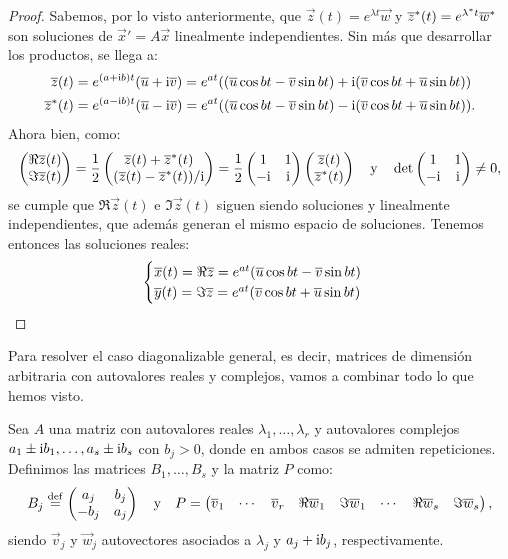 \documentclass[../ecuaciones_diferenciales.tex]{subfiles}
\begin{document}
\begin{proof}
	Sabemos, por lo visto anteriormente, que 
	\(\vec{z}(t) = e^{\lambda t} \vec{w}\) y
	\({\overline{z}}^\ast(t) = e^{{\lambda}^\ast t} {\overline{w}}^\ast\)
	son soluciones de \(\vec{x}' = A\vec{x}\) 
	linealmente independientes. Sin más que desarrollar los productos, se
	llega a:
	\begin{align*}
		\overline{z}(t) &= e^{(a + \mathrm{i} b)t} (\overline{u} + \mathrm{i}\overline{v}) 
		= e^{at} ((\overline{u}\cos bt - \overline{v}\sin bt) 
		+ \mathrm{i}(\overline{v}\cos bt +\overline{u}\sin bt)) \\
		{\overline{z}}^\ast(t) &= e^{(a - \mathrm{i} b)t} (\overline{u} - \mathrm{i}\overline{v}) 
		= e^{at} ((\overline{u}\cos bt - \overline{v}\sin bt) 
		- \mathrm{i}(\overline{v}\cos bt + \overline{u}\sin bt)).
	\end{align*}
	Ahora bien, como:
	\[\begin{pmatrix}\Re \overline{z}(t) \\ \Im \overline{z}(t)\end{pmatrix} 
		= \frac{1}{2} \begin{pmatrix}\overline{z}(t) + {\overline{z}}^\ast(t) \\
			(\overline{z}(t) - {\overline{z}}^\ast(t))/\mathrm{i}\end{pmatrix} 
		= \frac{1}{2}\begin{pmatrix}1 & 1 \\ -\mathrm{i} & \mathrm{i}\end{pmatrix} 
		\begin{pmatrix}\overline{z}(t) \\ {\overline{z}}^\ast(t)\end{pmatrix} 
		\quad \text{y} \quad 
		\det\begin{pmatrix}1 & 1 \\ -\mathrm{i} & \mathrm{i}\end{pmatrix} \neq 0,\]
	se cumple que \(\Re \vec{z}(t)\) e \(\Im \vec{z}(t)\) siguen siendo 
	soluciones y linealmente independientes, que además generan el mismo 
	espacio de soluciones. Tenemos entonces las soluciones reales:
	\[\begin{cases}
		\overline{x}(t) = \Re\overline{z} = e^{at}(\overline{u}\cos bt - \overline{v}\sin bt) \\
		\overline{y}(t) = \Im\overline{z} = e^{at}(\overline{v}\cos bt + \overline{u}\sin bt)\end{cases}\]
\end{proof}

Para resolver el caso diagonalizable general, es decir, matrices de dimensión
arbitraria con autovalores reales y complejos, vamos a combinar todo lo que 
hemos visto. 

Sea \(A\) una matriz con autovalores reales \(\lambda_1, \dots, \lambda_r\)
y autovalores complejos \(a_1 \pm \mathrm{i} b_1, \dots, a_s \pm \mathrm{i} b_s\) con 
\(b_j > 0\), donde en ambos casos se admiten repeticiones. 
Definimos las matrices \(B_1, \dots, B_s\) y la matriz \(P\) como:
\[B_j \overset{\operatorname{def}}{=} \begin{pmatrix}a_j & b_j \\ -b_j & a_j\end{pmatrix} 
	\quad \text{y} \quad
	P = \begin{pmatrix}\overline{v}_1 & \cdots & \overline{v}_r 
		& \Re \overline{w}_1 & \Im \overline{w}_1 & 
		\cdots & \Re \overline{w}_s & \Im \overline{w}_s\end{pmatrix},\]
siendo \(\vec{v}_j\) y \(\vec{w}_j\) autovectores asociados a \(\lambda_j\) 
y \(a_j + \mathrm{i} b_j\), respectivamente.
\end{document}
